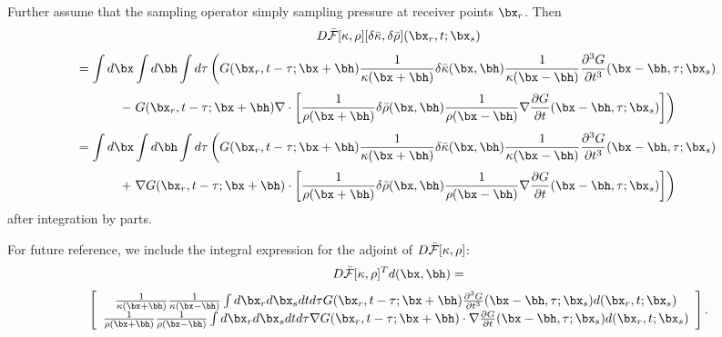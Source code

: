 Further assume that the sampling operator simply sampling pressure at receiver
points $\bx_r$. Then
\[
D\bar{{\cal F}}[\kappa,\rho][\delta 
\bar{\kappa},\delta\bar{\rho}](\bx_r,t;\bx_s) 
\]
\[
= \int d\bx\int d\bh \int d\tau \left(G(\bx_r,t-\tau;\bx+\bh) 
\frac{1}{\kappa(\bx+\bh)}  \delta \bar{\kappa}(\bx,\bh) \frac{1}{\kappa(\bx-\bh)}
 \frac{\partial^3 G}{\partial t^3}(\bx-\bh,\tau;\bx_s) 
\right. 
\]
\[
-\left.  G(\bx_r,t-\tau;\bx+\bh) \nabla \cdot \left[
\frac{1}{\rho(\bx+\bh)}  \delta \bar{\rho}(\bx,\bh) \frac{1}{\rho(\bx-\bh)}\nabla 
 \frac{\partial G}{\partial t}(\bx-\bh,\tau;\bx_s)\right]\right)
\]
\[
= \int d\bx\int d\bh \int d\tau \left(G(\bx_r,t-\tau;\bx+\bh) 
\frac{1}{\kappa(\bx+\bh)}  \delta \bar{\kappa}(\bx,\bh) \frac{1}{\kappa(\bx-\bh)}
 \frac{\partial^3 G}{\partial t^3}(\bx-\bh,\tau;\bx_s) 
\right.
\]
\begin{equation}
\label{eqn:intrep3}
+\left. \nabla G(\bx_r,t-\tau;\bx+\bh) \cdot \left[
\frac{1}{\rho(\bx+\bh)}  \delta \bar{\rho}(\bx,\bh) \frac{1}{\rho(\bx-\bh)}\nabla 
\frac{ \partial G}{\partial t}(\bx-\bh,\tau;\bx_s)\right]\right)
\end{equation}
after integration by parts.

For future reference, we include the integral expression for the
adjoint of $D\bar{{\cal F}}[\kappa,\rho]$:
\[
D\bar{{\cal F}}[\kappa,\rho]^Td(\bx,\bh) =
\]
\begin{equation}
\label{intrep3adj}
\left[
\begin{array}{c}
\frac{1}{\kappa(\bx+\bh)}\frac{1}{\kappa(\bx-\bh)}\int d\bx_r d\bx_s dt d\tau G(\bx_r,t-\tau;\bx+\bh) 
 \frac{\partial^3 G}{\partial t^3}(\bx-\bh,\tau;\bx_s)
  d(\bx_r,t;\bx_s)  \\
\frac{1}{\rho(\bx+\bh)}\frac{1}{\rho(\bx-\bh)}\int d\bx_r d\bx_s dt
  d\tau \nabla G(\bx_r,t-\tau;\bx+\bh) \cdot \nabla \frac{ \partial
  G}{\partial t}(\bx-\bh,\tau;\bx_s) d(\bx_r,t;\bx_s)
\end{array}
\right].
\end{equation}

